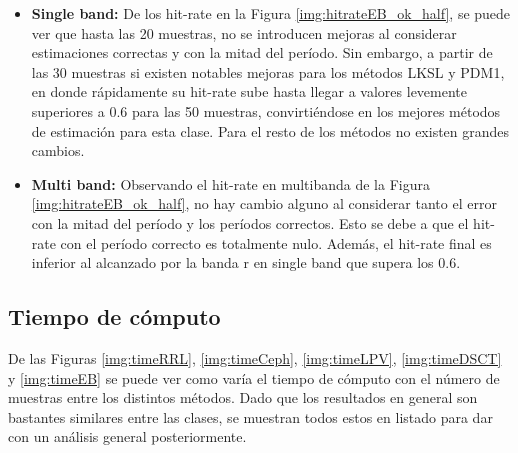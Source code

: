     	\begin{itemize}
    	    \item \textbf{Single band:} De los hit-rate en la Figura \ref{img:hitrateEB_ok_half}, se puede ver que hasta las 20 muestras, no se introducen mejoras al considerar estimaciones correctas y con la mitad del período. Sin embargo, a partir de las 30 muestras si existen notables mejoras para los métodos LKSL y PDM1, en donde rápidamente su hit-rate sube hasta llegar a valores levemente superiores a 0.6 para las 50 muestras, convirtiéndose en los mejores métodos de estimación para esta clase. Para el resto de los métodos no existen grandes cambios.
    	    
    	    \item \textbf{Multi band:}  Observando el hit-rate en multibanda de la Figura \ref{img:hitrateEB_ok_half}, no hay cambio alguno al considerar tanto el error con la mitad del período y los períodos correctos. Esto se debe a que el hit-rate con el período correcto es totalmente nulo. Además, el hit-rate final es inferior al alcanzado por la banda r en single band que supera los 0.6.
    	\end{itemize}    	
    	
    	
    	
\newpage
	\subsection{Tiempo de cómputo}
	
    De las Figuras \ref{img:timeRRL}, \ref{img:timeCeph}, \ref{img:timeLPV}, \ref{img:timeDSCT} y \ref{img:timeEB} se puede ver como varía el tiempo de cómputo con el número de muestras entre los distintos métodos. Dado que los resultados en general son bastantes similares entre las clases, se muestran todos estos en listado para dar con un análisis general posteriormente.
    
    	
	

